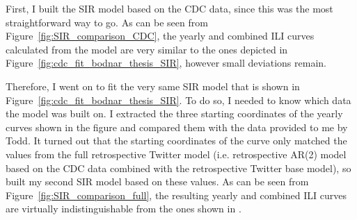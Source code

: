 \documentclass[11pt, a4paper]{report}\usepackage[]{graphicx}\usepackage[]{color}
\begin{document}
First, I built the SIR model based on the CDC data, since this was the most straightforward way to go. As can be seen from Figure~\ref{fig:SIR_comparison_CDC}, the yearly and combined ILI curves calculated from the model are very similar to the ones depicted in Figure~\ref{fig:cdc_fit_bodnar_thesis_SIR}, however small deviations remain.\newline

Therefore, I went on to fit the very same SIR model that is shown in Figure~\ref{fig:cdc_fit_bodnar_thesis_SIR}. To do so, I needed to know which data the model was built on. I extracted the three starting coordinates of the yearly curves shown in the figure and compared them with the data provided to me by Todd. It turned out that the starting coordinates of the curve only matched the values from the full retrospective Twitter model (i.e. retrospective AR(2) model based on the CDC data combined with the retrospective Twitter base model), so built my second SIR model based on these values. As can be seen from Figure~\ref{fig:SIR_comparison_full}, the resulting yearly and combined ILI curves are virtually indistinguishable from the ones shown in \citep{bodnar_data_2015}.\newline
\end{document}
